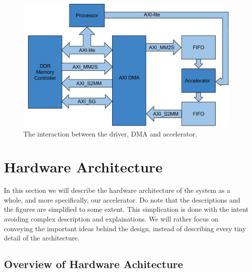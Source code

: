 \begin{figure}[h!]
  \centering
      \includegraphics[width=1.0\textwidth]{Figures/Method/DriverAcceleratorInteraction}
    \caption{The interaction between the driver, DMA and accelerator.}
    \label{fig_driver_acc_interact}
\end{figure}
 



\section{Hardware Architecture}

In this section we will describe the hardware architecture of the system as a whole, and more specifically, our accelerator. Do note that the descriptions and the figures are simplified to some extent. This simplication is done with the intent avoiding complex description and explainations. We will rather focus on conveying the important ideas behind the design, instead of describing every tiny detail of the architecture. 

\subsection{Overview of Hardware Achitecture}

